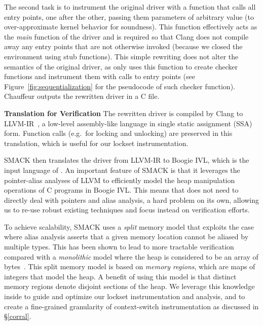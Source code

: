   The second task is to instrument the original driver with a function that calls all entry points, one after the other, passing them parameters of arbitrary value (to over-approximate kernel behavior for soundness). This function effectively acts as the \emph{main} function of the driver and is required so that Clang does not compile away any entry points that are not otherwise invoked (because we closed the environment using stub functions).   This simple rewriting does not alter the semantics of the original driver, as \whoop only uses this function to create checker functions and instrument them with calls to entry points (see Figure~\ref{fig:sequentialization} for the pseudocode of such checker function). Chauffeur outputs the rewritten driver in a C file.

\medskip\noindent\textbf{Translation for Verification }
%
The rewritten driver is compiled by Clang to LLVM-IR~\cite{lattner2004llvm}, a low-level assembly-like language in single static assignment (SSA) form. Function calls (e.g.\ for locking and unlocking) are preserved in this translation, which is useful for our lockset instrumentation.

SMACK then translates the driver from LLVM-IR to Boogie IVL, which is the input language of \whoop. An important feature of SMACK is that it leverages the pointer-alias analyses of LLVM to efficiently model the heap manipulation operations of C programs in Boogie IVL. This means that \whoop does not need to directly deal with pointers and alias analysis, a hard problem on its own, allowing us to re-use robust existing techniques and focus instead on verification efforts.

To achieve scalability, SMACK uses a \emph{split} memory model that exploits the case where
alias analysis asserts that a given memory location cannot be aliased by multiple types.
This has been shown to lead to more tractable verification compared with a \emph{monolithic} model where the heap is considered to be an array of bytes~\cite{rakamaric2009scalable}. This split memory model is based on \emph{memory regions}, which are maps of integers that model the heap. A benefit of using this model is that distinct memory regions denote disjoint sections of the heap. We leverage this knowledge inside \whoop to guide and optimize our lockset instrumentation and analysis, and to create a fine-grained granularity of context-switch instrumentation as discussed in \S\ref{corral}.

